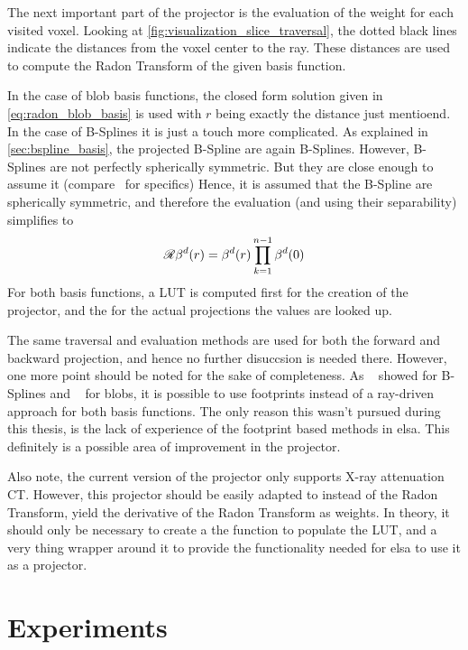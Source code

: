 The next important part of the projector is the evaluation of the weight for each visited voxel.
Looking at \autoref{fig:visualization_slice_traversal}, the dotted black lines indicate the
distances from the voxel center to the ray. These distances are used to compute the Radon Transform
of the given basis function.

In the case of blob basis functions, the closed form solution given in \autoref{eq:radon_blob_basis}
is used with \(r\) being exactly the distance just mentioend. In the case of B-Splines it is just a
touch more complicated. As explained in \autoref{sec:bspline_basis}, the projected B-Spline are
again B-Splines. However, B-Splines are not perfectly spherically symmetric. But they are close
enough to assume it (compare~\cite{momey_b-spline_2012, momey_spline_2015} for specifics) Hence, it
is assumed that the B-Spline are spherically symmetric, and therefore the evaluation (and using
their separability) simplifies to
\[ \mathscr{R}\beta^d(r) = \beta^d(r) \prod^{n - 1}_{k=1} \beta^d(0) \]
For both basis functions, a \gls{LUT} is computed first for the creation of the projector, and the
for the actual projections the values are looked up.

The same traversal and evaluation methods are used for both the forward and backward projection, and
hence no further disuccsion is needed there. However, one more point should be noted for the sake of
completeness. As \citeauthor*{momey_spline_2015}~\cite{momey_spline_2015} showed for B-Splines and
\citeauthor*{kohler_iterative_2011}~\cite{kohler_iterative_2011} for blobs, it is possible to use
footprints instead of a ray-driven approach for both basis functions. The only reason this wasn't
pursued during this thesis, is the lack of experience of the footprint based methods in elsa. This
definitely is a possible area of improvement in the projector.

Also note, the current version of the projector only supports X-ray attenuation CT. However, this
projector should be easily adapted to instead of the Radon Transform, yield the derivative of the
Radon Transform as weights. In theory, it should only be necessary to create a the function to
populate the \gls{LUT}, and a very thing wrapper around it to provide the functionality needed for
elsa to use it as a projector.

\chapter{Experiments}\label{chap:experiments}


